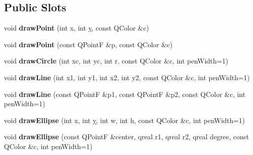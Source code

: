 \subsection*{Public Slots}
\begin{DoxyCompactItemize}
\item 
\hypertarget{class_d_o_1_1_painting_window_a0d126d763b4c0a6250c9880354111ff4}{void {\bfseries draw\-Point} (int x, int \hyperlink{group___channel_accessors_gac90c52c5b3a7b2a7e3761e6e84f25778}{y}, const Q\-Color \&c)}\label{class_d_o_1_1_painting_window_a0d126d763b4c0a6250c9880354111ff4}

\item 
\hypertarget{class_d_o_1_1_painting_window_a1b8b8efe20acf5e73b7521b2a5a0d155}{void {\bfseries draw\-Point} (const Q\-Point\-F \&p, const Q\-Color \&c)}\label{class_d_o_1_1_painting_window_a1b8b8efe20acf5e73b7521b2a5a0d155}

\item 
\hypertarget{class_d_o_1_1_painting_window_a7051cc5fd5f19b9070b60e35dde2cdd9}{void {\bfseries draw\-Circle} (int xc, int yc, int r, const Q\-Color \&c, int pen\-Width=1)}\label{class_d_o_1_1_painting_window_a7051cc5fd5f19b9070b60e35dde2cdd9}

\item 
\hypertarget{class_d_o_1_1_painting_window_a3871290c78c7c8d13a6fb157dab84be2}{void {\bfseries draw\-Line} (int x1, int y1, int x2, int y2, const Q\-Color \&c, int pen\-Width=1)}\label{class_d_o_1_1_painting_window_a3871290c78c7c8d13a6fb157dab84be2}

\item 
\hypertarget{class_d_o_1_1_painting_window_a9a95ae8faa3b0064053ed5683c5aab19}{void {\bfseries draw\-Line} (const Q\-Point\-F \&p1, const Q\-Point\-F \&p2, const Q\-Color \&c, int pen\-Width=1)}\label{class_d_o_1_1_painting_window_a9a95ae8faa3b0064053ed5683c5aab19}

\item 
\hypertarget{class_d_o_1_1_painting_window_ab48b68294566b5ef4bce71a551a1a3fb}{void {\bfseries draw\-Ellipse} (int x, int \hyperlink{group___channel_accessors_gac90c52c5b3a7b2a7e3761e6e84f25778}{y}, int w, int h, const Q\-Color \&c, int pen\-Width=1)}\label{class_d_o_1_1_painting_window_ab48b68294566b5ef4bce71a551a1a3fb}

\item 
\hypertarget{class_d_o_1_1_painting_window_a5234523b6d222165c2ccd1dc1235bc71}{void {\bfseries draw\-Ellipse} (const Q\-Point\-F \&center, qreal r1, qreal r2, qreal degree, const Q\-Color \&c, int pen\-Width=1)}\label{class_d_o_1_1_painting_window_a5234523b6d222165c2ccd1dc1235bc71}


\end{DoxyCompactItemize}
